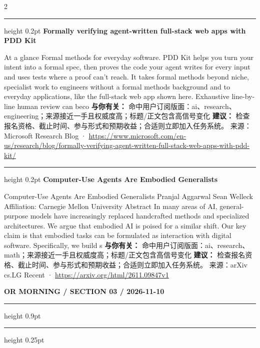 \documentclass[10.5pt]{ctexart}
\begin{document}
\begin{multicols}{2}
\vspace{2mm}
\hrule height 0.2pt
\vspace{2mm}
{\large\bfseries Formally verifying agent-written full-stack web apps with PDD Kit}\par
At a glance Formal methods for everyday software. PDD Kit helps you turn your intent into a formal spec, then proves the code your agent writes for every input and uses tests where a proof can’t reach. It takes formal methods beyond niche, specialist work to engineers without a formal methods background and to everyday applications, like the full-stack web app shown here. Exhaustive line-by-line human review can beco
\textbf{与你有关：} 命中用户订阅版面：ai、research、engineering；来源接近一手且权威度高；标题/正文包含高信号变化
\textbf{建议：} 检查报名资格、截止时间、参与形式和预期收益；合适则立即加入任务系统。
{\footnotesize\color{ormuted} 来源：Microsoft Research Blog · \url{https://www.microsoft.com/en-us/research/blog/formally-verifying-agent-written-full-stack-web-apps-with-pdd-kit/}}
\vspace{2mm}
\hrule height 0.2pt
\vspace{2mm}
{\large\bfseries Computer-Use Agents Are Embodied Generalists}\par
Computer-Use Agents Are Embodied Generalists Pranjal Aggarwal Sean Welleck Affiliation: Carnegie Mellon University Abstract In many areas of AI, general-purpose models have increasingly replaced handcrafted methods and specialized architectures. We argue that embodied AI is poised for a similar shift. Our key claim is that embodied tasks can be formulated as interaction with digital software. Specifically, we build s
\textbf{与你有关：} 命中用户订阅版面：ai、research、math；来源接近一手且权威度高；标题/正文包含高信号变化
\textbf{建议：} 检查报名资格、截止时间、参与形式和预期收益；合适则立即加入任务系统。
{\footnotesize\color{ormuted} 来源：arXiv cs.LG Recent · \url{https://arxiv.org/html/2611.09847v1}}
\end{multicols}
\newpage
{\small\bfseries OR MORNING / SECTION 03 / 2026-11-10}
\vspace{2mm}
\hrule height 0.9pt
\vspace{1.5mm}
\hrule height 0.25pt
\vspace{4mm}
\end{document}
